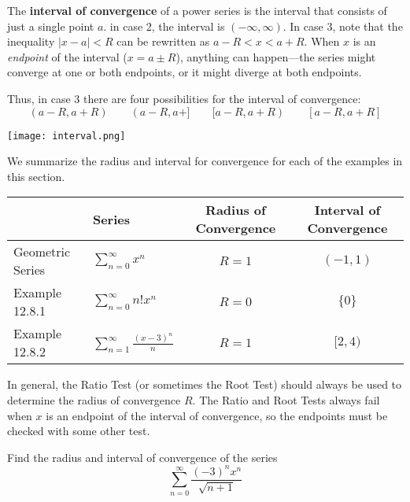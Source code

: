   The \textbf{interval of convergence} of a power series is the interval that consists of just a single point $a$. in case 2, the interval is $(-\infty,\infty)$. In case 3, note that the inequality $|x-a|<R$ can be rewritten as $a-R<x<a+R$. When $x$ is an \textit{endpoint} of the interval ($x=a \pm R$), anything can happen---the series might converge at one or both endpoints, or it might diverge at both endpoints. \par
  \begin{minipage}{\textwidth}
    Thus, in case 3 there are four possibilities for the interval of convergence:
    $$ (a-R,a+R) \qquad (a-R,a+] \qquad [a-R,a+R) \qquad [a-R,a+R] $$
    \begin{center}
      \texttt{[image: interval.png]}
    \end{center}
  \end{minipage}
  We summarize the radius and interval for convergence for each of the examples in this section.
  \begin{center}
    \bgroup
    \def\arraystretch{3.25}
    \begin{tabular}{ |l|l|c|c| }
     \hline
           & Series & Radius of Convergence & Interval of Convergence \\
      \hline
     Geometric Series & $\displaystyle\sum_{n=0}^{\infty} x^n$ & $R=1$ & $(-1,1)$ \\
     Example 12.8.1 & $\displaystyle\sum_{n=0}^{\infty} n!x^n$ & $R=0$ & $\{0\}$ \\
     Example 12.8.2 & $\displaystyle\sum_{n=1}^{\infty} \frac{(x-3)^n}{n}$ & $R=1$ & $[2,4)$ \\
     \hline
    \end{tabular}
    \egroup
  \end{center}
  In general, the Ratio Test (or sometimes the Root Test) should always be used to determine the radius of convergence $R$. The Ratio and Root Tests always fail when $x$ is an endpoint of the interval of convergence, so the endpoints must be checked with some other test.
  \begin{example}
    Find the radius and interval of convergence of the series
    $$\sum_{n=0}^{\infty} \frac{(-3)^n x^n}{\sqrt{n+1}}$$
  \end{example}
